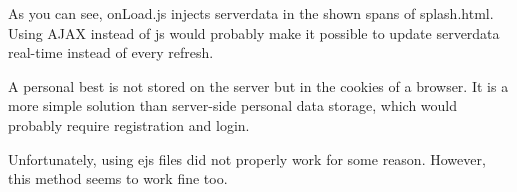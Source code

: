 \documentclass{article}
\begin{document}
As you can see, onLoad.js injects serverdata in the shown spans of splash.html. Using AJAX instead of js would probably make it possible to update serverdata real-time instead of every refresh.

A personal best is not stored on the server but in the cookies of a browser. It is a more simple solution than server-side personal data storage, which would probably require registration and login.

Unfortunately, using ejs files did not properly work for some reason. However, this method seems to work fine too.
\end{document}
